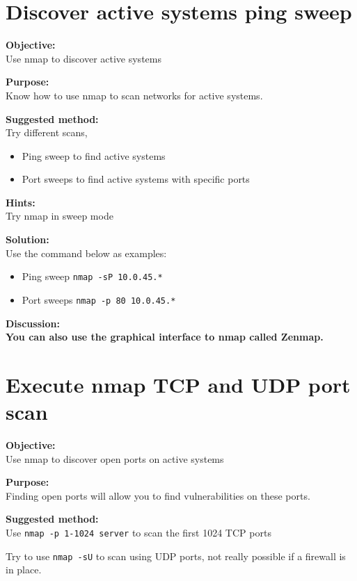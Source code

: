 \documentclass[a4paper,11pt,notitlepage]{report}
\begin{document}
\chapter{Discover active systems ping sweep}
\label{ex:nmap-pingsweep}

{\bf Objective:}\\
Use nmap to discover active systems

{\bf Purpose:}\\
Know how to use nmap to scan networks for active systems.

{\bf Suggested method:}\\
Try different scans,
\begin{itemize}
\item Ping sweep to find active systems
\item Port sweeps to find active systems with specific ports
\end{itemize}

{\bf Hints:} \\
Try nmap in sweep mode

{\bf Solution:}\\
Use the command below as examples:
\begin{itemize}
\item Ping sweep \verb+nmap -sP 10.0.45.*+
\item Port sweeps \verb+nmap -p 80 10.0.45.*+
\end{itemize}

{\bf Discussion:}\\

{\bf You can also use the graphical interface to nmap called Zenmap.}


\chapter{Execute nmap TCP and UDP port scan}
\label{ex:nmap-synscan}


{\bf Objective:} \\
Use nmap to discover open ports on active systems

{\bf Purpose:}\\
Finding open ports will allow you to find vulnerabilities on these ports.

{\bf Suggested method:}\\
Use \verb+nmap -p 1-1024 server+ to scan the first 1024 TCP
ports

Try to use \verb+nmap -sU+ to scan using UDP ports, not really possible if a firewall is in place.
\end{document}
